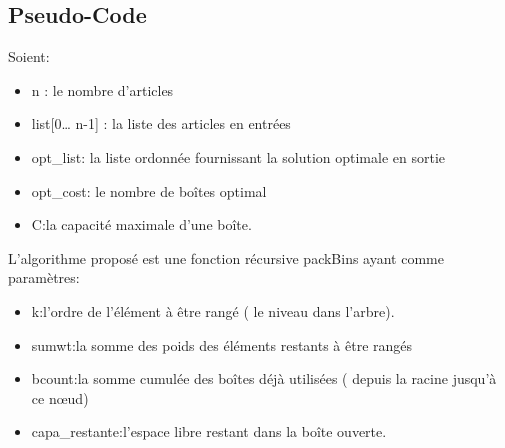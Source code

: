 \documentclass[12pt]{article}
\begin{document}
\subsection{Pseudo-Code}
Soient:
\begin{itemize}
    \item n : le nombre d’articles 
    \item list[0… n-1] : la liste des articles en entrées 
    \item opt\_list: la liste ordonnée fournissant la solution optimale en sortie 
    \item opt\_cost: le nombre de boîtes optimal
    \item C:la capacité maximale d’une boîte. 
\end{itemize}

L’algorithme proposé est une fonction récursive packBins ayant comme paramètres:
\begin{itemize}
    \item k:l’ordre de l’élément à être rangé ( le niveau dans l’arbre).
    \item sumwt:la somme des poids des éléments restants à être rangés
    \item bcount:la somme cumulée des boîtes déjà utilisées ( depuis la racine jusqu’à ce nœud)
    \item capa\_restante:l’espace libre restant dans la boîte ouverte.
     
\end{itemize}
\end{document}
